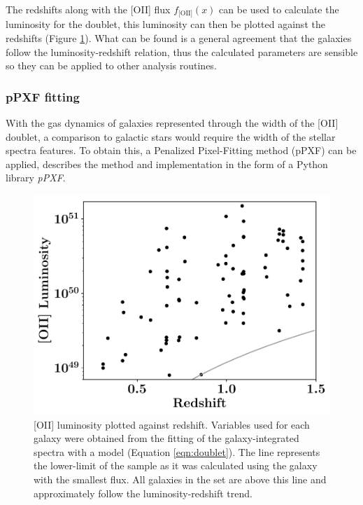 \documentclass[12pt, twocolumn]{revtex4-1}    %
\begin{document}
The redshifts along with the [OII] flux $f_{\text{[OII]}}(x)$ can be used to calculate the luminosity for the doublet, this luminosity can then be plotted against the redshifts (Figure \ref{fig:oiiluminosity_redshift}). What can be found is a general agreement that the galaxies follow the luminosity-redshift relation, thus the calculated parameters are sensible so they can be applied to other analysis routines.

\subsubsection{pPXF fitting}

With the gas dynamics of galaxies represented through the width of the [OII] doublet, a comparison to galactic stars would require the width of the stellar spectra features. To obtain this, a Penalized Pixel-Fitting method (pPXF) can be applied, \cite{cappaellari_ppxf} describes the method and implementation in the form of a Python library \textit{pPXF}.

\begin{figure}
\includegraphics[width=1.0\linewidth]{data/o_ii_luminosity_vs_redshift}
\caption{[OII] luminosity plotted against redshift. Variables used for each galaxy were obtained from the fitting of the galaxy-integrated spectra with a model (Equation \ref{eqn:doublet}). The line represents the lower-limit of the sample as it was calculated using the galaxy with the smallest flux. All galaxies in the set are above this line and approximately follow the luminosity-redshift trend.}
\label{fig:oiiluminosity_redshift}
\end{figure} 
\end{document}
